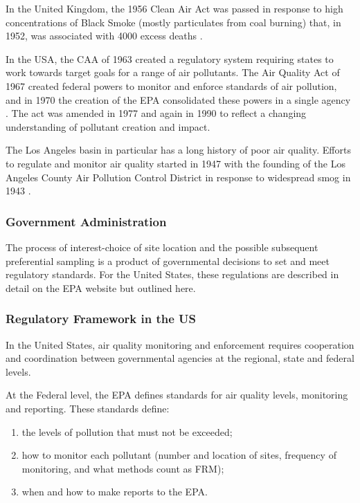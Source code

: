In the United Kingdom, the 1956 Clean Air Act was passed in response to high concentrations of Black Smoke (mostly particulates from coal burning) that, in 1952, was associated with 4000 excess deaths \cite{shaddick2014case}.

In the USA, the \ac{CAA} of 1963 created a regulatory system requiring states to work towards target goals for a range of air pollutants.  The Air Quality Act of 1967 created federal powers to monitor and enforce standards of air pollution, and in 1970 the creation of the \ac{EPA} consolidated these powers in a single agency %
.  The act was amended in 1977 and again in 1990 to reflect a changing understanding of pollutant creation and impact.  

The Los Angeles basin in particular has a long history of poor air quality.  Efforts to regulate and monitor air quality started in 1947 with the founding of the Los Angeles County Air Pollution Control District in response to widespread smog in 1943 
.
\subsubsection{Government Administration}
\label{subsec:govtadmin}
The process of interest-choice of site location and the possible subsequent preferential sampling is a product of governmental decisions to set and meet regulatory standards.  For the United States, these regulations are described in detail on the EPA website
but outlined here.

\subsubsection{Regulatory Framework in the US}
\label{subsubsec:regulation}
In the United States, air quality monitoring and enforcement requires cooperation and coordination between governmental agencies at the regional, state and federal levels.

At the Federal level, the \ac{EPA} defines standards for air quality levels, monitoring and reporting.   These standards define:
\begin{enumerate}
	\item the levels of pollution that must not be exceeded;
	\item how to monitor each pollutant (number and location of sites, frequency of monitoring, and what methods count as \ac{FRM});
	\item when and how to make reports to the \ac{EPA}.
\end{enumerate}

